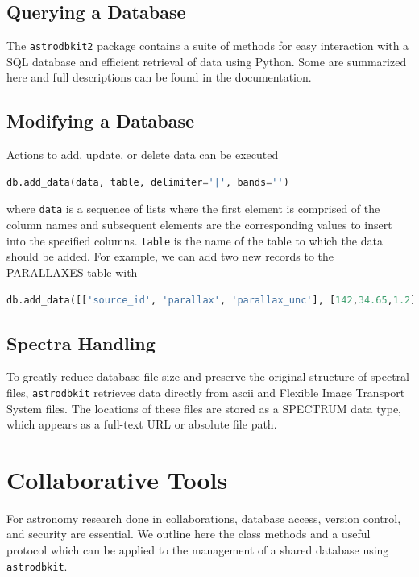 \documentclass[iop,revtex4,natbib209]{emulateapj}
\begin{document}
\subsection{Querying a Database}{\label{sec:query}}
The \texttt{astrodbkit2} package contains a suite of methods for easy interaction with a SQL database and efficient retrieval of data using Python. Some are summarized here and full descriptions can be found in the documentation.


\subsection{Modifying a Database}{\label{sec:modify}}
Actions to add, update, or delete data can be executed 

\begin{lstlisting}[language=Python]
db.add_data(data, table, delimiter='|', bands='')
\end{lstlisting}

where \texttt{data} is a sequence of lists where the first element is comprised of the column names and subsequent elements are the corresponding values to insert into the specified columns. \texttt{table} is the name of the table to which the data should be added. For example, we can add two new records to the PARALLAXES table with

\begin{lstlisting}[language=Python]
db.add_data([['source_id', 'parallax', 'parallax_unc'], [142,34.65,1.2], [21,94.22,0.5]], 'parallaxes')
\end{lstlisting}






\subsection{Spectra Handling}{\label{sec:spectra}}

To greatly reduce database file size and preserve the original structure of spectral files, \texttt{astrodbkit} retrieves data directly from ascii and Flexible Image Transport System \citep[FITS;][]{Hani01} files. The locations of these files are stored as a SPECTRUM data type, which appears as a full-text URL or absolute file path. 

\section{Collaborative Tools}{\label{sec:collaborate}}
For astronomy research done in collaborations, database access, version control, and security are essential. We outline here the class methods and a useful protocol which can be applied to the management of a shared database using \texttt{astrodbkit}.
\end{document}
